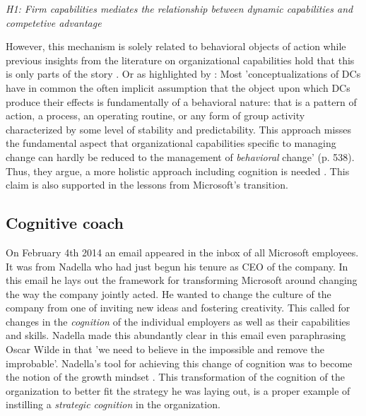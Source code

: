 \documentclass[review,fleqn]{elsarticle}\usepackage[]{graphicx}\usepackage[]{color}
\begin{document}
\emph{H1: Firm capabilities mediates the relationship between dynamic capabilities and
  competetive advantage}

However, this mechanism is solely related to behavioral objects of action while previous
insights from the literature on organizational capabilities hold that this is only parts
of the story \cite{Tripsas2000,Gavetti2012}. Or as highlighted by \cite{Verona2011}: Most
'conceptualizations of DCs have in common the often implicit assumption that the object
upon which DCs produce their effects is fundamentally of a behavioral nature: that is a
pattern of action, a process, an operating routine, or any form of group activity
characterized by some level of stability and predictability. This approach misses the
fundamental aspect that organizational capabilities specific to managing change can
hardly be reduced to the management of \emph{behavioral} change' (p. 538). Thus, they
argue, a more holistic approach including cognition is needed \citep{Zollo2016}. This claim is also
supported in the lessons from Microsoft's transition.



\subsection*{Cognitive coach}

On February 4th 2014 an email appeared in the inbox of all Microsoft employees. It was
from Nadella who had just begun his tenure as CEO of the company. In this email he lays
out the framework for transforming Microsoft around changing the way the company jointly
acted. He wanted to change the culture of the company from one of inviting new ideas and
fostering creativity. This called for changes in the \emph{cognition} of the individual
employers as well as their capabilities and skills. Nadella made this abundantly clear in
this email even paraphrasing Oscar Wilde in that 'we need to believe in the impossible and
remove the improbable'. Nadella's tool for achieving this change of cognition was to
become the notion of the growth mindset \citep{Dweck2016}. This transformation of the
cognition of the organization to better fit the strategy he was laying out, is a proper
example of instilling a \emph{strategic cognition} in the organization.
\end{document}
